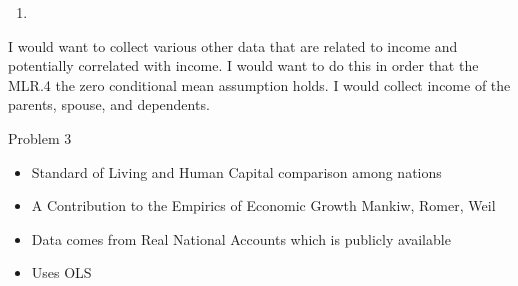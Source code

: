 \documentclass[
  12pt,
  landscape]{article}
\providecommand{\tightlist}{%
  \setlength{\itemsep}{0pt}\setlength{\parskip}{0pt}}
\begin{document}
\begin{enumerate}
\def\labelenumi{(\alph{enumi})}
\setcounter{enumi}{2}
\item
\end{enumerate}

I would want to collect various other data that are related to income
and potentially correlated with income. I would want to do this in order
that the MLR.4 the zero conditional mean assumption holds. I would
collect income of the parents, spouse, and dependents.

Problem 3

\begin{itemize}
\tightlist
\item
  Standard of Living and Human Capital comparison among nations
\item
  A Contribution to the Empirics of Economic Growth Mankiw, Romer, Weil
\item
  Data comes from Real National Accounts which is publicly available
\item
  Uses OLS
\end{itemize}
\end{document}
